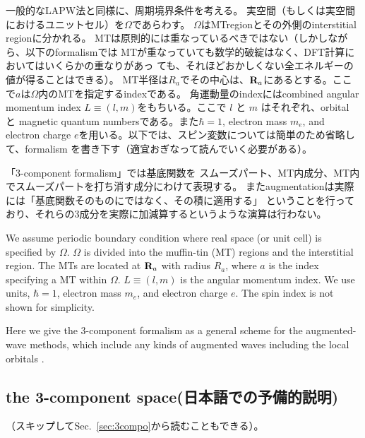 \documentclass[twocolumn,showpacs,preprintnumbers,amsmath,amssymb,floatfix]{revtex4-1}
\newcommand{\bfR}{{\bf R}}
\newcommand{\refsec}[1]{\mbox{Sec.~\!\ref{#1}}}
\begin{document}
一般的なLAPW法と同様に、周期境界条件を考える。
実空間（もしくは実空間におけるユニットセル）を$\Omega$であらわす。
$\Omega$はMTregionとその外側のinterstitial regionに分かれる。
MTは原則的には重なっているべきではない（しかしながら、以下のformalismでは
MTが重なっていても数学的破綻はなく、DFT計算においてはいくらかの重なりがあっ
ても、それほどおかしくない全エネルギーの値が得ることはできる）。
MT半径は$R_a$でその中心は、$\bfR_a$にあるとする。ここで$a$は$\Omega$内のMTを指定するindexである。
角運動量のindexにはcombined angular momentum index
$L\equiv(l,m)$をもちいる。ここで $l$ と $m$ はそれぞれ、orbital と magnetic quantum
numbersである。また$\hbar=1$, electron mass $m_e$, and electron charge
$e$を用いる。以下では、スピン変数については簡単のため省略して、formalism
を書き下す（適宜おぎなって読んでいく必要がある）。

「3-component formalism」では基底関数を
スムーズパート、MT内成分、MT内でスムーズパートを打ち消す成分にわけて表現する。
またaugmentationは実際には「基底関数そのものにではなく、その積に適用する」
ということを行っており、それらの3成分を実際に加減算するというような演算は行わない。

We assume periodic boundary condition where
real space (or unit cell) is specified by $\Omega$.
$\Omega$ is divided into the muffin-tin (MT) regions and the interstitial region.
The MTs are located at $\bfR_a$ with radius $R_a$, where 
$a$ is the index specifying a MT within $\Omega$.
$L\equiv(l,m)$ is the angular momentum index.
We use units, $\hbar=1$, electron mass $m_e$, and electron charge $e$. 
The spin index is not shown for simplicity.

Here we give the 3-component formalism as a general
scheme for the augmented-wave methods, which include any kinds of
augmented waves including the local orbitals \cite{PhysRevB.43.6388}.


\subsection{the 3-component space(日本語での予備的説明)}
\label{sec:3compoj}
（スキップして\refsec{sec:3compo}から読むこともできる）。
\end{document}
